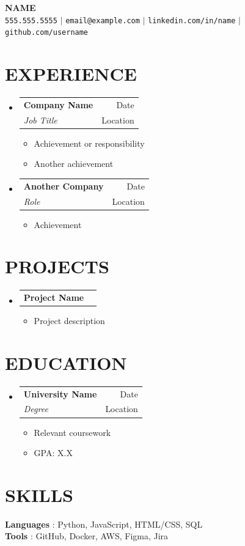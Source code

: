 \documentclass[letterpaper,11pt]{article}
\makeatletter
\newcommand{\resumeItem}[1]{
  \item\small{
    {#1 \vspace{-1pt}}
  }
}
\newcommand{\resumeSubheading}[4]{
  \vspace{-1pt}\item
    \begin{tabular*}{\textwidth}[t]{l@{\extracolsep{\fill}}r}
      \textbf{#1} & {\color{dark-grey}\small #2}\vspace{1pt}\\
      \textit{#3} & {\color{dark-grey} \small #4}\\
    \end{tabular*}\vspace{-4pt}
}
\newcommand{\resumeProjectHeading}[2]{
    \item
    \begin{tabular*}{\textwidth}{l@{\extracolsep{\fill}}r}
      #1 & {\color{dark-grey}} \\
    \end{tabular*}\vspace{-4pt}
}
\newcommand{\resumeSubHeadingListStart}{\begin{itemize}[leftmargin=0in, label={}]}
\newcommand{\resumeSubHeadingListEnd}{\end{itemize}}
\newcommand{\resumeItemListStart}{\begin{itemize}}
\newcommand{\resumeItemListEnd}{\end{itemize}\vspace{0pt}}
\makeatother
\begin{document}
\begin{center}
    \textbf{\Huge NAME} \\ \vspace{5pt}
    \small \faPhone* \texttt{555.555.5555} $|$ 
    \hspace{1pt} \faEnvelope \hspace{2pt} \texttt{email@example.com} $|$ 
    \hspace{1pt} \faLinkedIn \hspace{2pt} \texttt{linkedin.com/in/name} $|$ 
    \hspace{1pt} \faGithub \hspace{2pt}\texttt{github.com/username}
    \\ \vspace{-3pt}
\end{center}

\section{EXPERIENCE}
  \resumeSubHeadingListStart
    \resumeSubheading
      {Company Name}{Date}
      {Job Title}{Location}
      \resumeItemListStart
        \resumeItem{Achievement or responsibility}
        \resumeItem{Another achievement}
      \resumeItemListEnd

    \resumeSubheading
      {Another Company}{Date}
      {Role}{Location}
      \resumeItemListStart
        \resumeItem{Achievement}
      \resumeItemListEnd
  \resumeSubHeadingListEnd

\section{PROJECTS}
    \resumeSubHeadingListStart
      \resumeProjectHeading
          {\textbf{Project Name}}{Date}
          \resumeItemListStart
            \resumeItem{Project description}
          \resumeItemListEnd
    \resumeSubHeadingListEnd

\section{EDUCATION}
  \resumeSubHeadingListStart
    \resumeSubheading
      {University Name}{Date}
      {Degree}{Location}
      	\resumeItemListStart
    	\resumeItem {Relevant coursework}
        \resumeItem{GPA: X.X}
        \resumeItemListEnd
  \resumeSubHeadingListEnd

\section{SKILLS}
 \begin{itemize}[leftmargin=0in, label={}]
    \small{\item{
     \textbf{Languages} {: Python, JavaScript, HTML/CSS, SQL}\vspace{2pt} \\
     \textbf{Tools}     {: GitHub, Docker, AWS, Figma, Jira}
    }}
 \end{itemize}
\end{document}
